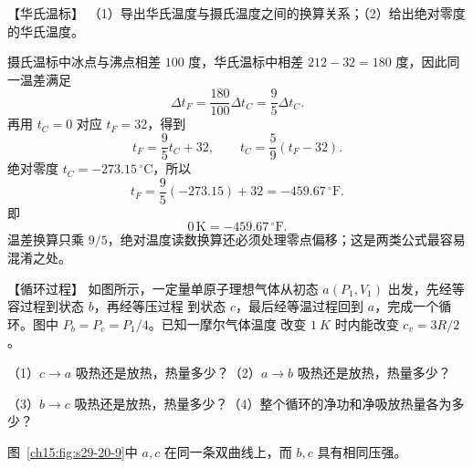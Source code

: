 {\begin{origexamplebox}{【华氏温标】}
（1）导出华氏温度与摄氏温度之间的换算关系；（2）给出绝对零度的华氏温度。

\ThQFahrenheit
\end{origexamplebox}\par\nopagebreak[4]

\par\nopagebreak[4]\begin{xesolution}
\ThAFahrenheit

摄氏温标中冰点与沸点相差 $100$ 度，华氏温标中相差 $212-32=180$ 度，因此同一温差满足
\begin{equation*}
  \Delta t_F=\frac{180}{100}\Delta t_C=\frac95\Delta t_C.
\end{equation*}
再用 $t_C=0$ 对应 $t_F=32$，得到
\begin{equation}
  \boxed{t_F=\frac95t_C+32},
  \qquad
  \boxed{t_C=\frac59(t_F-32)}.
\end{equation}
绝对零度 $t_C=-273.15\,{}^\circ\mathrm C$，所以
\begin{equation*}
  t_F=\frac95(-273.15)+32=-459.67\,{}^\circ\mathrm F.
\end{equation*}
即
\begin{equation}
  \boxed{0\,\mathrm K=-459.67\,{}^\circ\mathrm F}.
\end{equation}
温差换算只乘 $9/5$，绝对温度读数换算还必须处理零点偏移；这是两类公式最容易混淆之处。
\end{xesolution}


\begin{origexamplebox}{【循环过程】}\label{ch15:ex:s29-20-9}
如图所示，一定量单原子理想气体从初态 $a(P_1,V_1)$ 出发，先经等容过程到状态 $b$，再经等压过程
到状态 $c$，最后经等温过程回到 $a$，完成一个循环。图中 $P_b=P_c=P_1/4$。已知一摩尔气体温度
改变 $\SI{1}{K}$ 时内能改变 $c_v=3R/2$。

（1）$c\to a$ 吸热还是放热，热量多少？（2）$a\to b$ 吸热还是放热，热量多少？

（3）$b\to c$ 吸热还是放热，热量多少？（4）整个循环的净功和净吸放热量各为多少？
\par\noindent\begin{minipage}{\linewidth}
\cycleQuestionRedraw
{}\label{ch15:fig:s29-20-9}
\end{minipage}\par\medskip
图~\ref{ch15:fig:s29-20-9}中 $a,c$ 在同一条双曲线上，而 $b,c$ 具有相同压强。
\end{origexamplebox}
\par\nopagebreak[4]

}
